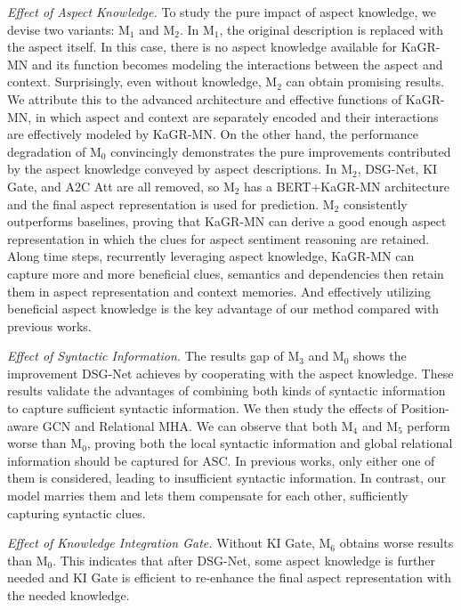 \textit{Effect of Aspect Knowledge.}
To study the pure impact of aspect knowledge, we devise two variants: M$_1$ and M$_2$. 
In M$_1$, the original description is replaced with the aspect itself.
In this case, there is no aspect knowledge available for KaGR-MN and its function becomes modeling the interactions between the aspect and context.
Surprisingly, even without knowledge, M$_2$ can obtain promising results. 
We attribute this to the advanced architecture and effective functions of KaGR-MN, in which aspect and context are separately encoded and their interactions are effectively modeled by KaGR-MN.
On the other hand, the performance degradation of M$_0$ convincingly demonstrates the pure improvements contributed by the aspect knowledge conveyed by aspect descriptions.
In M$_2$, DSG-Net, KI Gate, and A2C Att are all removed, so M$_2$ has a BERT+KaGR-MN architecture and the final aspect representation is used for prediction.
M$_2$ consistently outperforms baselines, proving that KaGR-MN can derive a good enough aspect representation in which the clues for aspect sentiment reasoning are retained.
Along time steps, recurrently leveraging aspect knowledge, KaGR-MN can capture more and more beneficial clues, semantics and dependencies then retain them in aspect representation and context memories.
And effectively utilizing beneficial aspect knowledge is the key advantage of our method compared with previous works.

\textit{Effect of Syntactic Information.}
The results gap of M$_3$ and M$_0$ shows the improvement DSG-Net achieves by cooperating with the aspect knowledge.
These results validate the advantages of combining both kinds of syntactic information to capture sufficient syntactic information.
We then study the effects of Position-aware GCN and Relational MHA.
We can observe that both M$_4$ and M$_5$ perform worse than M$_0$, proving both the local syntactic information and global relational information should be captured for ASC.
In previous works, only either one of them is considered, leading to insufficient syntactic information.
In contrast, our model marries them and lets them compensate for each other, sufficiently capturing syntactic clues.




\textit{Effect of Knowledge Integration Gate.}
Without KI Gate, M$_6$ obtains worse results than M$_0$.
This indicates that after DSG-Net, some aspect knowledge is further needed and KI Gate is efficient to re-enhance the final aspect representation with the needed knowledge.

